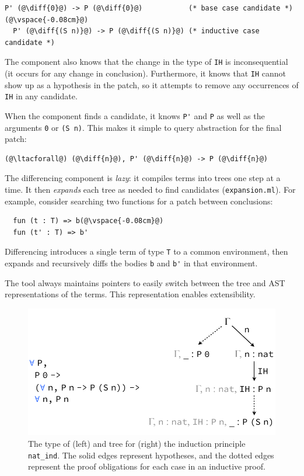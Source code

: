 \begin{lstlisting}[language=coq]
  P' (@\diff{0}@) -> P (@\diff{0}@)           (* base case candidate *)(@\vspace{-0.08cm}@)
  P' (@\diff{(S n)}@) -> P (@\diff{(S n)}@) (* inductive case candidate *)
\end{lstlisting}
The component also knows that the change in the type of \lstinline{IH} is inconsequential (it occurs for any change in conclusion).
Furthermore, it knows that \lstinline{IH} cannot show up as a hypothesis in the patch,
so it attempts to remove any occurrences of \lstinline{IH} in any candidate.

When the component finds a candidate, it knows \lstinline{P'} and \lstinline{P}
as well as the arguments \lstinline{0} or \lstinline{(S n)}. This makes it simple
to query abstraction for the final patch:

\begin{lstlisting}[language=coq]
  (@\ltacforall@) (@\diff{n}@), P' (@\diff{n}@) -> P (@\diff{n}@)
\end{lstlisting}
The differencing component is \textit{lazy}: it compiles terms into trees one step at a time.
It then \emph{expands} each tree as needed to find candidates (\lstinline{expansion.ml}).
For example, consider searching two functions for a patch between conclusions:

\begin{lstlisting}
  fun (t : T) => b(@\vspace{-0.08cm}@)
  fun (t' : T) => b'
\end{lstlisting}
Differencing introduces a single term of type \lstinline{T} to a common environment,
then expands and recursively diffs the bodies \lstinline{b} and \lstinline{b'} in that environment.

The tool always maintains pointers to easily switch between the tree and AST representations of the terms.
This representation enables extensibility.

\begin{figure}[t]
\begin{center}
\includegraphics[scale=0.55]{repair/nat_ind}
\end{center}
\caption{The type of (left) and tree for (right) the induction principle \lstinline{nat_ind}. The solid edges represent hypotheses, and the dotted edges represent the proof obligations for each case in an inductive proof.}
\label{fig:cattree}
\end{figure}

